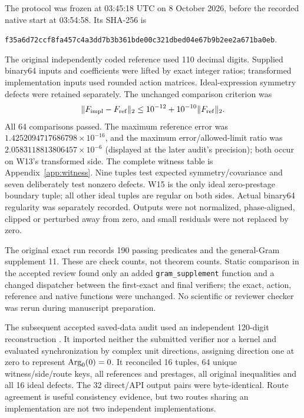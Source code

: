 \documentclass[11pt,a4paper]{article}
\numberwithin{equation}{section}
\begin{document}
The protocol was frozen at 03:45:18 UTC on 8 October 2026, before the recorded native start at 03:54:58. Its SHA-256 is
\begin{center}\footnotesize\nolinkurl{f35a6d72ccf8fa457c4a3dd7b3b361bde00c321dbed04e67b9b2ee2a671ba0eb}.\end{center}
The original independently coded reference used 110 decimal digits. Supplied binary64 inputs and coefficients were lifted by exact integer ratios; transformed implementation inputs used rounded action matrices. Ideal-expression symmetry defects were retained separately. The unchanged comparison criterion was
\begin{equation}\label{eq:tolerance}
 \|F_{\rm impl}-F_{\rm ref}\|_2\le10^{-12}+10^{-10}\|F_{\rm ref}\|_2.
\end{equation}
All 64 comparisons passed. The maximum reference error was $1.4252094717686798\times10^{-16}$, and the maximum error/allowed-limit ratio was $2.0583118813806457\times10^{-6}$ (displayed at the later audit's precision); both occur on W13's transformed side. The complete witness table is Appendix~\ref{app:witness}. Nine tuples test expected symmetry/covariance and seven deliberately test nonzero defects. W15 is the only ideal zero-prestage boundary tuple; all other ideal tuples are regular on both sides. Actual binary64 regularity was separately recorded. Outputs were not normalized, phase-aligned, clipped or perturbed away from zero, and small residuals were not replaced by zero.

The original exact run records 190 passing predicates and the general-Gram supplement 11. These are check counts, not theorem counts. Static comparison in the accepted review found only an added \texttt{gram\_supplement} function and a changed dispatcher between the first-exact and final verifiers; the exact, action, reference and native functions were unchanged. No scientific or reviewer checker was rerun during manuscript preparation.

The subsequent accepted saved-data audit used an independent 120-digit reconstruction \cite{addendum}. It imported neither the submitted verifier nor a kernel and evaluated synchronization by complex unit directions, assigning direction one at zero to represent $\operatorname{Arg}_0(0)=0$. It reconciled 16 tuples, 64 unique witness/side/route keys, all references and prestages, all original inequalities and all 16 ideal defects. The 32 direct/API output pairs were byte-identical. Route agreement is useful consistency evidence, but two routes sharing an implementation are not two independent implementations.
\end{document}
